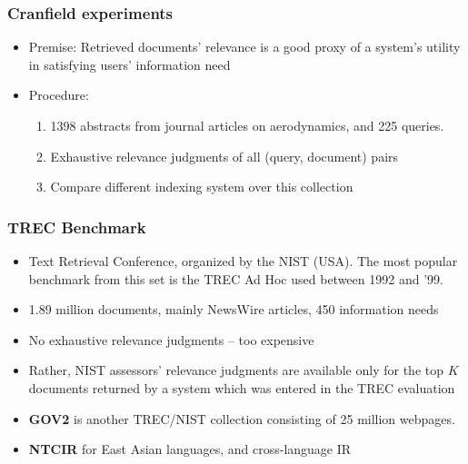 \documentclass{article}
\begin{document}
\subsubsection{Cranfield experiments}
\begin{itemize}
    \item Premise: Retrieved documents’ relevance is a good proxy of a system’s utility in satisfying users’ information need
    
    \item Procedure:
    \begin{enumerate}
        \item 1398 abstracts from journal articles on aerodynamics, and 225 queries. 
        
        \item Exhaustive relevance judgments of all (query, document) pairs
        
        \item Compare different indexing system over this collection
    \end{enumerate}
\end{itemize}

\subsubsection{TREC Benchmark}
\begin{itemize}
    \item Text Retrieval Conference, organized by the NIST (USA). The most popular benchmark from this set is the TREC Ad Hoc used between 1992 and '99. 
    
    \item 1.89 million documents, mainly NewsWire articles, 450 information needs
    
    \item No exhaustive relevance judgments – too expensive

    \item Rather, NIST assessors’ relevance judgments are available only for the top $K$ documents returned by a system which was entered in the TREC evaluation
    
    \item \textbf{GOV2} is another TREC/NIST collection consisting of 25 million webpages. 
    
    \item \textbf{NTCIR} for East Asian languages, and cross-language IR
\end{itemize}
\end{document}
